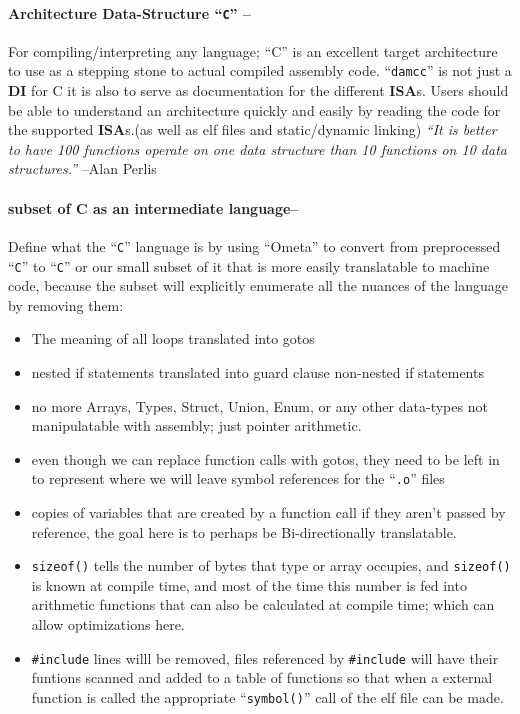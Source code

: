 \hypertarget{architecture-data-structure-c}{%
\paragraph{\texorpdfstring{Architecture Data-Structure ``\texttt{C}''
--}{Architecture Data-Structure ``C'' --}}\label{architecture-data-structure-c}}

For compiling/interpreting any language; ``C'' is an excellent target
architecture to use as a stepping stone to actual compiled assembly
code. ``\texttt{damcc}'' is not just a \textbf{DI} for C it is also to
serve as documentation for the different \textbf{ISA}s. Users should be
able to understand an architecture quickly and easily by reading the
code for the supported \textbf{ISA}s.(as well as elf files and
static/dynamic linking) \emph{``It is better to have 100 functions
operate on one data structure than 10 functions on 10 data
structures.''} --Alan Perlis

\hypertarget{subset-of-c-as-an-intermediate-language}{%
\paragraph{subset of C as an intermediate
language--}\label{subset-of-c-as-an-intermediate-language}}

Define what the ``\texttt{C}'' language is by using ``Ometa'' to convert
from preprocessed ``\texttt{C}'' to ``\texttt{C}'' or our small subset
of it that is more easily translatable to machine code, because the
subset will explicitly enumerate all the nuances of the language by
removing them:

\begin{itemize}
\tightlist
\item
  The meaning of all loops translated into gotos
\item
  nested if statements translated into guard clause non-nested if
  statements
\item
  no more Arrays, Types, Struct, Union, Enum, or any other data-types
  not manipulatable with assembly; just pointer arithmetic.
\item
  even though we can replace function calls with gotos, they need to be
  left in to represent where we will leave symbol references for the
  ``\texttt{.o}'' files
\item
  copies of variables that are created by a function call if they aren't
  passed by reference, the goal here is to perhaps be Bi-directionally
  translatable.
\item
  \texttt{sizeof()} tells the number of bytes that type or array
  occupies, and \texttt{sizeof()} is known at compile time, and most of
  the time this number is fed into arithmetic functions that can also be
  calculated at compile time; which can allow optimizations here.
\item
  \texttt{\#include} lines willl be removed, files referenced by
  \texttt{\#include} will have their funtions scanned and added to a
  table of functions so that when a external function is called the
  appropriate ``\texttt{symbol()}'' call of the elf file can be made.
\end{itemize}

